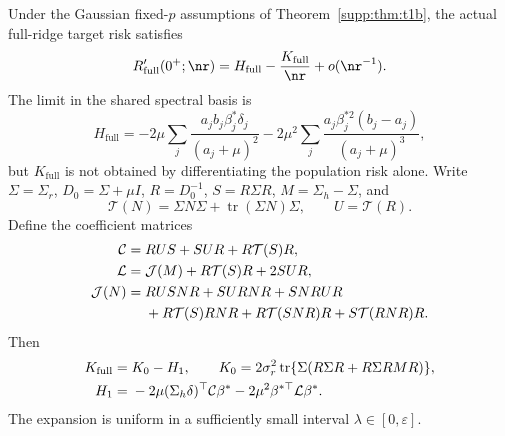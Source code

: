 \begin{theorem}\label{supp:thm:fullprime}
Under the Gaussian fixed-$p$ assumptions of Theorem~\ref{supp:thm:t1b}, the actual full-ridge target risk satisfies
\begin{equation}
  R_{\mathrm{full}}'(0^+;\nr)=H_{\mathrm{full}}-\frac{K_{\mathrm{full}}}{\nr}+o(\nr^{-1}).
  \label{supp:eq:fullprime}
\end{equation}
The limit in the shared spectral basis is
\begin{equation}
 H_{\mathrm{full}}=-2\mu\sum_j\frac{a_jb_j\beta_j^*\delta_j}{(a_j+\mu)^2}
 -2\mu^2\sum_j\frac{a_j\beta_j^{*2}(b_j-a_j)}{(a_j+\mu)^3},
\end{equation}
but $K_{\mathrm{full}}$ is not obtained by differentiating the population risk alone.
Write $\Sigma=\Sigma_r$, $D_0=\Sigma+\mu I$, $R=D_0^{-1}$, $S=R\Sigma R$, $M=\Sigma_h-\Sigma$, and
\begin{equation}
  \mathcal T(N)=\Sigma N\Sigma+\operatorname{tr}(\Sigma N)\Sigma,\qquad U=\mathcal T(R).
\end{equation}
Define the coefficient matrices
\begin{align}
  \mathcal C={}&RUS+SUR+R\mathcal T(S)R,\notag\\
  \mathcal L={}&\mathcal J(M)+R\mathcal T(S)R+2SUR,\notag\\
  \mathcal J(N)={}&RUSNR+SURNR+SNRUR\notag\\
  &+R\mathcal T(S)RNR+R\mathcal T(SNR)R+S\mathcal T(RNR)R.
  \label{supp:eq:fullgram}
\end{align}
Then
\begin{align}
  K_{\mathrm{full}}={}&K_0-H_1,\qquad
  K_0=2\sigma_r^2\operatorname{tr}\{\Sigma(R\Sigma R+R\Sigma RMR)\},\notag\\
  H_1={}&-2\mu(\Sigma_h\delta)^\top\mathcal C\beta^*
  -2\mu^2\beta^{*\top}\mathcal L\beta^*.
  \label{supp:eq:kfull}
\end{align}
The expansion is uniform in a sufficiently small interval $\lambda\in[0,\varepsilon]$.
\end{theorem}

